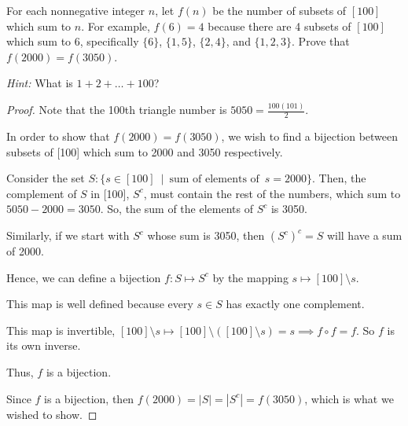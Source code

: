 \documentclass[../hw1]{subfiles}
\begin{document}
For each nonnegative integer $n$, let $f(n)$ be the number of subsets of $[100]$ which sum to $n$.
For example, $f(6) = 4$ because there are 4 subsets of $[100]$ which sum to 6,
specifically $\{6\}$, $\{1,5\}$, $\{2,4\}$, and $\{1,2,3\}$.
Prove that $f(2000) = f(3050)$.

\emph{Hint:} What is $1 + 2 + \dots + 100$?
\begin{proof}
	Note that the 100th triangle number is $5050=\frac{100(101)}{2}$.

	In order to show that $f(2000) = f(3050)$, we wish to find a bijection between subsets of [100] which sum to 2000 and 3050 respectively.

	Consider the set $S: \{ s \in [100]\ \mid\ \text{sum of elements of }\,s = 2000\} $.
	Then, the complement of $S$ in [100], $S^{c}$, must contain the rest of the numbers, which sum to $5050-2000=3050$.
	So, the sum of the elements of $S^{c}$ is 3050.

	Similarly, if we start with $S^{c}$ whose sum is 3050, then $(S^{c})^{c}=S$ will have a sum of 2000.

	Hence, we can define a bijection $f: S \longmapsto S^{c}$ by the mapping $s \mapsto [100]\setminus s$.

	This map is well defined because every  $s \in S$ has exactly one complement.

	This map is invertible, $[100]\setminus s \mapsto [100]\setminus ([100] \setminus s) = s  \implies f \circ f = f$.
	So $f$ is its own inverse.

	Thus, $f$ is a bijection.

	Since $f$ is a bijection, then $f(2000) = |S| = |S^{c}| = f(3050)$, which is what we wished to show.
\end{proof}
\end{document}
